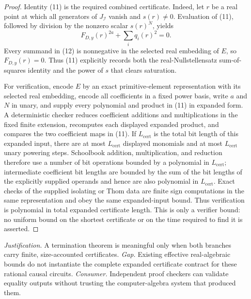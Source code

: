 \documentclass{article}
\begin{document}
\begin{proof}
Identity (11) is the required combined certificate.  Indeed, let \(r\) be a real point at which all generators of \(J_{\mathcal I}\) vanish and \(s(r)\neq0\).  Evaluation of (11), followed by division by the nonzero scalar \(s(r)^N\), yields
\[
 F_{D,y}(r)^{2a}+\sum_iq_i(r)^2=0. \tag{12}
\]
Every summand in (12) is nonnegative in the selected real embedding of \(E\), so \(F_{D,y}(r)=0\).  Thus (11) explicitly records both the real-Nullstellensatz sum-of-squares identity and the power of \(s\) that clears saturation.

For verification, encode \(E\) by an exact primitive-element representation with its selected real embedding, encode all coefficients in a fixed power basis, write \(a\) and \(N\) in unary, and supply every polynomial and product in (11) in expanded form.  A deterministic checker reduces coefficient additions and multiplications in the fixed finite extension, recomputes each displayed expanded product, and compares the two coefficient maps in (11).  If \(L_{\mathrm{cert}}\) is the total bit length of this expanded input, there are at most \(L_{\mathrm{cert}}\) displayed monomials and at most \(L_{\mathrm{cert}}\) unary powering steps.  Schoolbook addition, multiplication, and reduction therefore use a number of bit operations bounded by a polynomial in \(L_{\mathrm{cert}}\); intermediate coefficient bit lengths are bounded by the sum of the bit lengths of the explicitly supplied operands and hence are also polynomial in \(L_{\mathrm{cert}}\).  Exact checks of the supplied isolating or Thom data are finite sign computations in the same representation and obey the same expanded-input bound.  Thus verification is polynomial in total expanded certificate length.  This is only a verifier bound: no uniform bound on the shortest certificate or on the time required to find it is asserted.
\end{proof}
\par\smallskip\noindent \textit{Justification.} A termination theorem is meaningful only when both branches carry finite, size-accounted certificates. \textit{Gap.} Existing effective real-algebraic bounds do not instantiate the complete expanded certificate contract for these rational causal circuits. \textit{Consumer.} Independent proof checkers can validate equality outputs without trusting the computer-algebra system that produced them.
\end{document}
